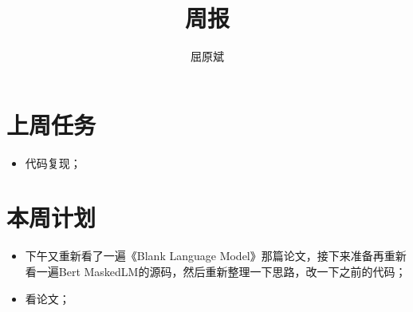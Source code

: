 \documentclass[UTF8]{article}
\title{周报}
\author{屈原斌}
\begin{document}
	\maketitle
	\section{上周任务}
		\begin{itemize}
			\item 代码复现；
		\end{itemize}

	\section{本周计划}
		\begin{itemize}
			\item 下午又重新看了一遍《Blank Language Model》那篇论文，接下来准备再重新看一遍Bert MaskedLM的源码，然后重新整理一下思路，改一下之前的代码；
			\item 看论文；
		\end{itemize}
		
\end{document}

